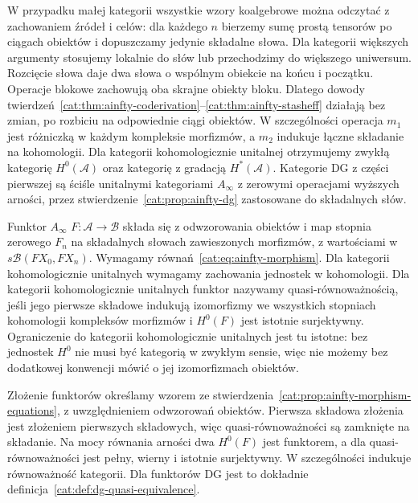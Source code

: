 W przypadku małej kategorii wszystkie wzory koalgebrowe można odczytać z zachowaniem źródeł i celów: dla każdego $n$ bierzemy sumę prostą tensorów po ciągach obiektów i dopuszczamy jedynie składalne słowa. Dla kategorii większych argumenty stosujemy lokalnie do słów lub przechodzimy do większego uniwersum. Rozcięcie słowa daje dwa słowa o wspólnym obiekcie na końcu i początku. Operacje blokowe zachowują oba skrajne obiekty bloku. Dlatego dowody twierdzeń~\ref{cat:thm:ainfty-coderivation}--\ref{cat:thm:ainfty-stasheff} działają bez zmian, po rozbiciu na odpowiednie ciągi obiektów. W szczególności operacja $m_1$ jest różniczką w każdym kompleksie morfizmów, a $m_2$ indukuje łączne składanie na kohomologii. Dla kategorii kohomologicznie unitalnej otrzymujemy zwykłą kategorię $H^0(\mathcal A)$ oraz kategorię z gradacją $H^*(\mathcal A)$. Kategorie DG z części pierwszej są ściśle unitalnymi kategoriami $A_\infty$ z zerowymi operacjami wyższych arności, przez stwierdzenie~\ref{cat:prop:ainfty-dg} zastosowane do składalnych słów.

\begin{definicja}\label{cat:def:ainfty-functor}
Funktor $A_\infty$ $F:\mathcal A\to\mathcal B$ składa się z odwzorowania obiektów i map stopnia zerowego $F_n$ na składalnych słowach zawieszonych morfizmów, z wartościami w $s\mathcal B(FX_0,FX_n)$. Wymagamy równań~\eqref{cat:eq:ainfty-morphism}. Dla kategorii kohomologicznie unitalnych wymagamy zachowania jednostek w kohomologii. Dla kategorii kohomologicznie unitalnych funktor nazywamy quasi-równoważnością, jeśli jego pierwsze składowe indukują izomorfizmy we wszystkich stopniach kohomologii kompleksów morfizmów i $H^0(F)$ jest istotnie surjektywny. Ograniczenie do kategorii kohomologicznie unitalnych jest tu istotne: bez jednostek $H^0$ nie musi być kategorią w zwykłym sensie, więc nie możemy bez dodatkowej konwencji mówić o jej izomorfizmach obiektów.
\end{definicja}

Złożenie funktorów określamy wzorem ze stwierdzenia~\ref{cat:prop:ainfty-morphism-equations}, z uwzględnieniem odwzorowań obiektów. Pierwsza składowa złożenia jest złożeniem pierwszych składowych, więc quasi-równoważności są zamknięte na składanie. Na mocy równania arności dwa $H^0(F)$ jest funktorem, a dla quasi-równoważności jest pełny, wierny i istotnie surjektywny. W szczególności indukuje równoważność kategorii. Dla funktorów DG jest to dokładnie definicja~\ref{cat:def:dg-quasi-equivalence}.

